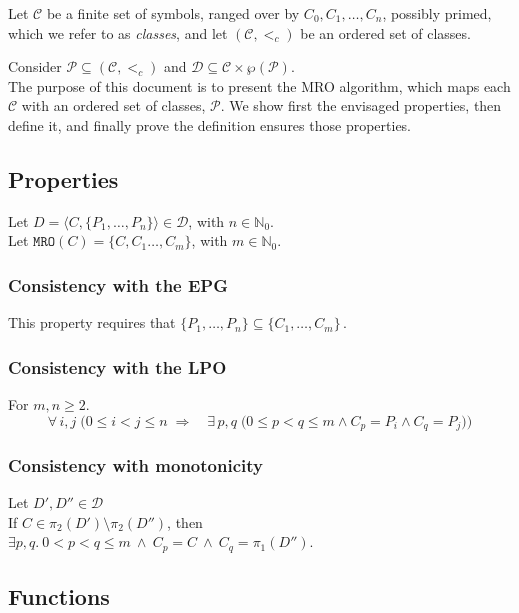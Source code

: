 \documentclass[runningheads]{llncs}
\newcommand*{\CC}{\ensuremath{\mathcal{C}}\xspace}
\newcommand*{\DD}{\ensuremath{\mathcal{D}}\xspace}
\newcommand*{\ordCC}{\ensuremath{(\mathcal{C}, <_c)}\xspace}
\newcommand*{\mro}{\texttt{MRO}}
\newcommand*{\natz}{\ensuremath{\mathbb{N}_0}}
\begin{document}
Let \CC be a finite set of symbols, ranged over by \( C_0, C_1, \ldots, C_n \), possibly primed, which we refer to as \emph{classes}, and let \ordCC be an ordered set of classes. %

Consider $\mathcal P \subseteq \ordCC$ and $\DD \subseteq \CC \times \wp{(\mathcal P)}$.\\

The purpose of this document is to present the MRO algorithm,
which maps each $\CC$ with an ordered set of classes, $\mathcal P$. We show first the envisaged properties, then define it, and finally prove the definition ensures those properties.

\subsection{Properties}
\label{subsec:PropertiesformalSpec}


Let $D = \langle C, \{P_1, \dots, P_n\} \rangle \in \DD$, with $n\in\natz$.\\
Let $\mro(C) = \{C,C_1 \dots, C_m\}$, with $m \in \natz$.\\
\subsubsection{Consistency with the EPG} 
This property requires that
\(
\{P_1, \dots, P_n\} \subseteq \{C_1, \dots, C_m\}\,.
\)


\subsubsection{Consistency with the LPO}
For $m,n \geq 2$.
\begin{equation*}
\forall\,i,j\;\bigl(0\le i<j\le n \;\Longrightarrow \quad \exists\,p,q\;\bigl(0\le p<q\le m \wedge C_p=P_i \wedge C_q=P_j\bigr)\bigr)
\end{equation*}
\subsubsection{Consistency with monotonicity}

Let $D', D'' \in \DD$ \\
If $C \in \pi_2(D') \setminus \pi_2(D'')$, then\\ $\exists p,q. \ 0 < p < q \leq m \ \wedge \ C_p = C \ \wedge \ C_q = \pi_1(D'')$.

\subsection{Functions}
\end{document}
